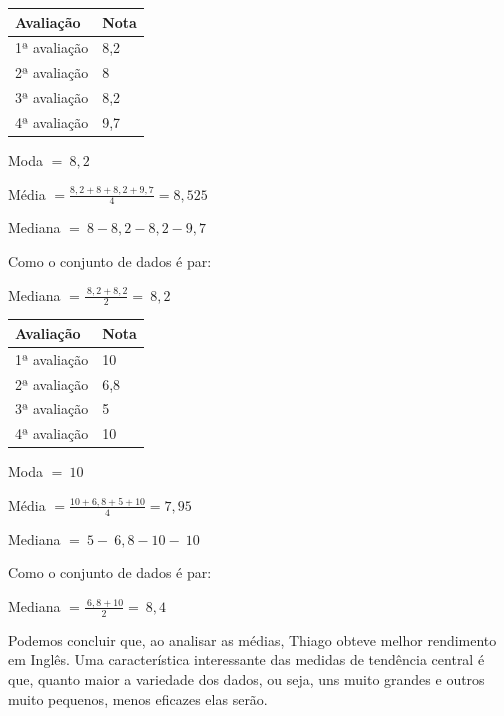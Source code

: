 {\vspace*{5mm}

{\medskip    \hfill
  \begin{tabular}{ll}
    \toprule
    Avaliação & Nota \\
    \midrule
    1ª avaliação & 8,2 \\
    2ª avaliação & 8 \\
    3ª avaliação & 8,2 \\
    4ª avaliação & 9,7 \\
    \bottomrule
  \end{tabular} \hfill 
}

\vspace*{5mm}

Moda $= \ 8,2$

Média $= \frac{8,2 + 8 + 8,2 + 9,7}{4} = 8,525$

Mediana $= \ 8  - 8,2  - 8,2  - 9,7\ $ 

Como o conjunto de dados é par:

Mediana $ = \frac{\ 8,2 + 8,2}{2} = \ 8,2$


\vspace*{5mm}


{\hfill    \centering
  \begin{tabular}{ll}
    \toprule
    Avaliação & Nota \\
    \midrule
    1ª avaliação & 10 \\
    2ª avaliação & 6,8 \\
    3ª avaliação & 5 \\
    4ª avaliação & 10 \\
    \bottomrule
  \end{tabular}
 \hfill}

\vspace*{1cm}

Moda $= \ 10$

Média $= \frac{10 + 6,8 + 5 + 10}{4} = 7,95$

Mediana $= \ 5 - \ 6,8  - 10 - \ 10\ $

Como o conjunto de dados é par:

Mediana $= \frac{\ 6,8 + 10}{2} = \ 8,4$

Podemos concluir que, ao analisar as médias, Thiago obteve melhor
rendimento em Inglês. Uma característica interessante das medidas de
tendência central é que, quanto maior a variedade dos dados, ou seja,
uns muito grandes e outros muito pequenos, menos eficazes elas serão.

}
